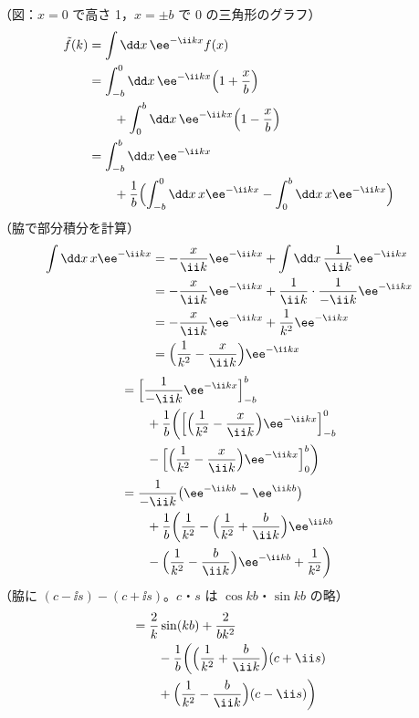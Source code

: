 （図：$x=0$ で高さ 1，$x=\pm b$ で 0 の三角形のグラフ）
\begin{align*}
  \tilde f(k)&=\int\dd x\,\ee^{-\ii kx}f(x)\\
  &=\int_{-b}^{0}\dd x\,\ee^{-\ii kx}\Bigl(1+\frac{x}{b}\Bigr)\\
  &\qquad+\int_{0}^{b}\dd x\,\ee^{-\ii kx}\Bigl(1-\frac{x}{b}\Bigr)\\
  &=\int_{-b}^{b}\dd x\,\ee^{-\ii kx}\\
  &\qquad+\frac{1}{b}\Bigl(\int_{-b}^{0}\dd x\,x\ee^{-\ii kx}-\int_{0}^{b}\dd x\,x\ee^{-\ii kx}\Bigr)
\end{align*}
（脇で部分積分を計算）
\begin{align*}
  \int\dd x\,x\ee^{-\ii kx}&=-\frac{x}{\ii k}\ee^{-\ii kx}+\int\dd x\,\frac{1}{\ii k}\ee^{-\ii kx}\\
  &=-\frac{x}{\ii k}\ee^{-\ii kx}+\frac{1}{\ii k}\cdot\frac{1}{-\ii k}\ee^{-\ii kx}\\
  &=-\frac{x}{\ii k}\ee^{-\ii kx}+\frac{1}{k^{2}}\ee^{-\ii kx}\\
  &=\Bigl(\frac{1}{k^{2}}-\frac{x}{\ii k}\Bigr)\ee^{-\ii kx}
\end{align*}
\begin{align*}
  &=\Bigl[\frac{1}{-\ii k}\ee^{-\ii kx}\Bigr]_{-b}^{b}\\
  &\qquad+\frac{1}{b}\biggl(\Bigl[\Bigl(\frac{1}{k^{2}}-\frac{x}{\ii k}\Bigr)\ee^{-\ii kx}\Bigr]_{-b}^{0}\\
  &\qquad-\Bigl[\Bigl(\frac{1}{k^{2}}-\frac{x}{\ii k}\Bigr)\ee^{-\ii kx}\Bigr]_{0}^{b}\biggr)\\
  &=\frac{1}{-\ii k}\bigl(\ee^{-\ii kb}-\ee^{\ii kb}\bigr)\\
  &\qquad+\frac{1}{b}\biggl(\frac{1}{k^{2}}-\Bigl(\frac{1}{k^{2}}+\frac{b}{\ii k}\Bigr)\ee^{\ii kb}\\
  &\qquad-\Bigl(\frac{1}{k^{2}}-\frac{b}{\ii k}\Bigr)\ee^{-\ii kb}+\frac{1}{k^{2}}\biggr)
\end{align*}
（脇に $(c-\ii s)-(c+\ii s)$。$c$・$s$ は $\cos kb$・$\sin kb$ の略）
\begin{align*}
  &=\frac{2}{k}\sin(kb)+\frac{2}{bk^{2}}\\
  &\qquad-\frac{1}{b}\biggl(\Bigl(\frac{1}{k^{2}}+\frac{b}{\ii k}\Bigr)(c+\ii s)\\
  &\qquad+\Bigl(\frac{1}{k^{2}}-\frac{b}{\ii k}\Bigr)(c-\ii s)\biggr)
\end{align*}
